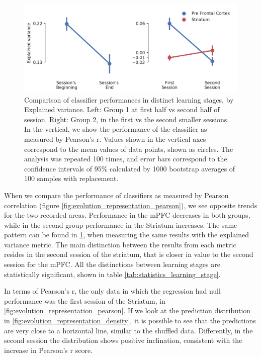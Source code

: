 \begin{figure}[ht]
    \centering
    \includegraphics[width=\textwidth]{figures/expvar_comparison_before_after_learning.png}
    \caption[Comparison of classifier performances in distinct learning stages, by Explained variance]{Comparison of classifier performances in distinct learning stages, by Explained variance. Left: Group 1 at first half vs second half of session. Right: Group 2, in the first vs the second smaller sessions. In the vertical, we show the performance of the classifier as measured by Pearson's r. Values shown in the vertical axes correspond to the mean values of data points, shown as circles. The analysis was repeated 100 times, and error bars correspond to the confidence intervals of 95\% calculated by 1000 bootstrap averages of 100 samples with replacement.}
    \label{fig:evolution_representation_variance}
\end{figure}


When we compare the performance of classifiers as measured by Pearson correlation (figure \ref{fig:evolution_representation_pearson}), we see opposite trends for the two recorded areas. Performance in the mPFC decreases in both groups, while in the second group performance in the Striatum increases. The same pattern can be found in \ref{fig:evolution_representation_variance}, when measuring the same results with the explained variance metric. The main distinction between the results from each metric resides in the second session of the striatum, that is closer in value to the second session for the mPFC. All the distinctions between learning stages are statistically significant, shown in table \ref{tab:statistics_learning_stage}. 

In terms of Pearson's r, the only data in which the regression had null performance was the first session of the Striatum, in \ref{fig:evolution_representation_pearson}. If we look at the prediction distribution in \ref{fig:evolution_representation_density}, it is possible to see that the predictions are very close to a horizontal line, similar to the shuffled data. Differently, in the second session the distribution shows positive inclination, consistent with the increase in Pearson's r score.

